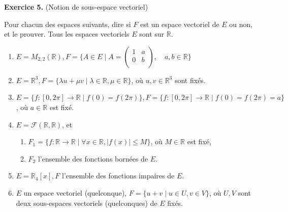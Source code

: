 \documentclass[a4paper, 10pt]{report}
\begin{document}
	\newpage
	\vspace{5mm}
	\noindent
	\textbf{Exercice 5.} (Notion de sous-espace vectoriel)
	
	\indent Pour chacun des espaces suivants, dire si $F$ est un espace
	vectoriel de $E$ ou non, et le prouver. Tous les espaces vectoriels
	$E$ sont sur $\mathbb{R}$.
	
	\begin{enumerate}[label=\arabic*.]
		\item $E = M_{2, 2}(\mathbb{R}), F = \bigg\{ A \in E
			\mid A = 
			\begin{pmatrix}
				1& a\\
				0& b\\
			\end{pmatrix}
			, \quad a, b \in \mathbb{R} \bigg\}$
		\item $E = \mathbb{R}^3, F = \{\lambda u + \mu v \mid
			\lambda \in \mathbb{R}, \mu \in \mathbb{R}\}$,
		où $u, v \in \mathbb{R}^3$ sont fixés.
		\item $E = \{f : [0, 2\pi] \rightarrow \mathbb{R} \mid
			f(0) = f(2\pi)\}, F = \{f : [0, 2\pi] \rightarrow
			\mathbb{R} \mid f(0) = f(2\pi) = a\}$,
		où $a \in \mathbb{R}$ est fixé.
		\item $E = \mathcal{F}(\mathbb{R}, \mathbb{R})$, et
			\begin{enumerate}[label=(\alph*)]
				\item $F_1 = \{f : \mathbb{R} \rightarrow \mathbb{R}
					\mid \forall x \in \mathbb{R}, |f(x)| \leq M\}$,
					où $M \in \mathbb{R}$ est fixé,
				\item $F_2$ l'ensemble des fonctions bornées de $E$.
			\end{enumerate}
		\item $E = \mathbb{R}_4[x], F$ l'ensemble des fonctions impaires de $E$.
		\item $E$ un espace vectoriel (quelconque), $F = \{u + v 
			\mid u \in U, v \in V\}$, où $U, V$ sont deux
			sous-espaces vectoriels (quelconques) de $E$ fixés.
	\end{enumerate}
	
\end{document}
